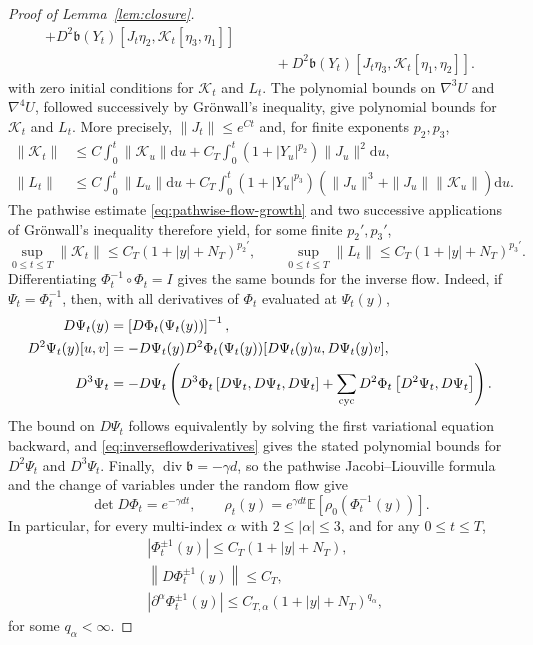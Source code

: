 \documentclass[11pt]{article}
\theoremstyle{definition}
\newcommand{\E}{\mathbb E}
\newcommand{\dd}{\mathrm d}
\newcommand{\Id}{I}
\begin{document}
\begin{proof}[Proof of Lemma~\ref{lem:closure}]
\[\begin{aligned}
 +D^2\mathfrak b(Y_t)[J_t\eta_2,\mathcal K_t[\eta_3,\eta_1]]\\
 &\qquad
 +D^2\mathfrak b(Y_t)[J_t\eta_3,\mathcal K_t[\eta_1,\eta_2]].
\end{aligned}
\]
with zero initial conditions for $\mathcal K_t$ and $L_t$. The polynomial bounds on
$\nabla^3U$ and $\nabla^4U$, followed successively by Gr\"{o}nwall's inequality,
give polynomial bounds for $\mathcal K_t$ and $L_t$.
More precisely, $\|J_t\|\leq e^{Ct}$ and, for finite exponents $p_2,p_3$,
\begin{align*}
 \|\mathcal K_t\|&\leq C\int_0^t\|\mathcal K_u\|\dd u
 +C_T\int_0^t(1+|Y_u|^{p_2})\|J_u\|^2\dd u,\\
 \|L_t\|&\leq C\int_0^t\|L_u\|\dd u
 +C_T\int_0^t(1+|Y_u|^{p_3})
 \left(\|J_u\|^3+\|J_u\|\|\mathcal K_u\|\right)\dd u.
\end{align*}
The pathwise estimate \eqref{eq:pathwise-flow-growth}
and two successive applications of
Gr\"{o}nwall's inequality therefore yield, for some finite $p_2',p_3'$,
\[
 \sup_{0\leq t\leq T}\|\mathcal K_t\|
 \leq C_T(1+|y|+N_T)^{p_2'},\qquad
 \sup_{0\leq t\leq T}\|L_t\|
 \leq C_T(1+|y|+N_T)^{p_3'}.
\]
Differentiating $\Phi_t^{-1}\circ\Phi_t=\Id$ gives the same bounds for the
inverse flow.
Indeed, if $\Psi_t=\Phi_t^{-1}$, then, with all derivatives of $\Phi_t$
evaluated at $\Psi_t(y)$,
\begin{equation}\label{eq:inverseflowderivatives}
\begin{aligned}
 D\Psi_t(y)&=\left[D\Phi_t(\Psi_t(y))\right]^{-1},\\
 D^2\Psi_t(y)[u,v]
 &=-D\Psi_t(y)D^2\Phi_t(\Psi_t(y))
       [D\Psi_t(y)u,D\Psi_t(y)v],\\
 D^3\Psi_t
 &=-D\Psi_t\left(
 D^3\Phi_t\left[D\Psi_t,D\Psi_t,D\Psi_t\right]
 +\sum_{\rm cyc}D^2\Phi_t\left[D^2\Psi_t,D\Psi_t\right]\right).
\end{aligned}
\end{equation}
The bound on $D\Psi_t$ follows equivalently by solving the first variational
equation backward, and \eqref{eq:inverseflowderivatives}
gives the stated polynomial
bounds for $D^2\Psi_t$ and $D^3\Psi_t$.
Finally, $\operatorname{div}\mathfrak b=-\gamma d$, so the pathwise
Jacobi--Liouville formula \cite{Kunita1990}
and
the change of variables under the random flow give
\begin{equation}\label{eq:flowdensity}
 \det D\Phi_t=e^{-\gamma dt},\qquad
 \rho_t(y)=e^{\gamma dt}\E\left[\rho_0\left(\Phi_t^{-1}(y)\right)\right].
\end{equation}
In particular, for every multi-index
$\alpha$ with $2\leq|\alpha|\leq3$,
and for any $0\leq t\leq T$,
\begin{equation}\label{eq:flowbounds}
\begin{aligned}
 &\left|\Phi_t^{\pm1}(y)\right|\leq C_T(1+|y|+N_T),
 \\
 &\left\|D\Phi_t^{\pm1}(y)\right\|\leq C_T,
 \\
 &\left|\partial^\alpha\Phi_t^{\pm1}(y)\right|
 \leq C_{T,\alpha}(1+|y|+N_T)^{q_\alpha},
\end{aligned}
\end{equation}
for some $q_\alpha<\infty$.


\end{proof}
\end{document}
